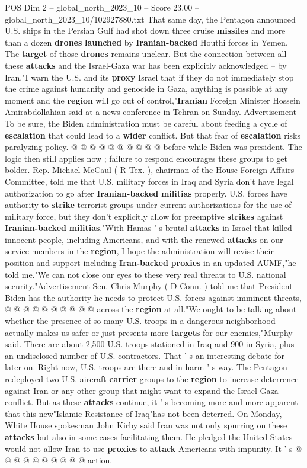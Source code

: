\begin{textsample}{POS Dim 2 – global\_north\_2023\_10 – Score 23.00 – global\_north\_2023\_10/102927880.txt}
That same day, the Pentagon announced U.S. ships in the Persian Gulf had shot down three cruise \textbf{missiles} and more than a dozen \textbf{drones} \textbf{launched} by \textbf{Iranian-backed} Houthi forces in Yemen.
The \textbf{target} of those \textbf{drones} remains unclear.
But the connection between all these \textbf{attacks} and the Israel-Gaza war has been explicitly acknowledged -- by Iran."I warn the U.S. and its \textbf{proxy} Israel that if they do not immediately stop the crime against humanity and genocide in Gaza, anything is possible at any moment and the \textbf{region} will go out of control,"\textbf{Iranian} Foreign Minister Hossein Amirabdollahian said at a news conference in Tehran on Sunday.
Advertisement To be sure, the Biden administration must be careful about feeding a cycle of \textbf{escalation} that could lead to a \textbf{wider} conflict.
But that fear of \textbf{escalation} risks paralyzing policy. @ @ @ @ @ @ @ @ @ @ before while Biden was president.
The logic then still applies now ; failure to respond encourages these groups to get bolder.
Rep.
Michael McCaul ( R-Tex. ), chairman of the House Foreign Affairs Committee, told me that U.S. military forces in Iraq and Syria don't have legal authorization to go after \textbf{Iranian-backed} \textbf{militias} properly.
U.S. forces have authority to \textbf{strike} terrorist groups under current authorizations for the use of military force, but they don't explicitly allow for preemptive \textbf{strikes} against \textbf{Iranian-backed} \textbf{militias}."With Hamas ' s brutal \textbf{attacks} in Israel that killed innocent people, including Americans, and with the renewed \textbf{attacks} on our service members in the \textbf{region}, I hope the administration will revise their position and support including \textbf{Iran-backed} \textbf{proxies} in an updated AUMF,"he told me."We can not close our eyes to these very real threats to U.S. national security."Advertisement Sen.
Chris Murphy ( D-Conn. ) told me that President Biden has the authority he needs to protect U.S. forces against imminent threats, @ @ @ @ @ @ @ @ @ @ across the \textbf{region} at all."We ought to be talking about whether the presence of so many U.S. troops in a dangerous neighborhood actually makes us safer or just presents more \textbf{targets} for our enemies,"Murphy said.
There are about 2,500 U.S. troops stationed in Iraq and 900 in Syria, plus an undisclosed number of U.S. contractors.
That ' s an interesting debate for later on.
Right now, U.S. troops are there and in harm ' s way.
The Pentagon redeployed two U.S. aircraft \textbf{carrier} groups to the \textbf{region} to increase deterrence against Iran or any other group that might want to expand the Israel-Gaza conflict.
But as these \textbf{attacks} continue, it ' s becoming more and more apparent that this new"Islamic Resistance of Iraq"has not been deterred.
On Monday, White House spokesman John Kirby said Iran was not only spurring on these \textbf{attacks} but also in some cases facilitating them.
He pledged the United States would not allow Iran to use \textbf{proxies} to \textbf{attack} Americans with impunity.
It ' s @ @ @ @ @ @ @ @ @ @ action.


\end{textsample}
